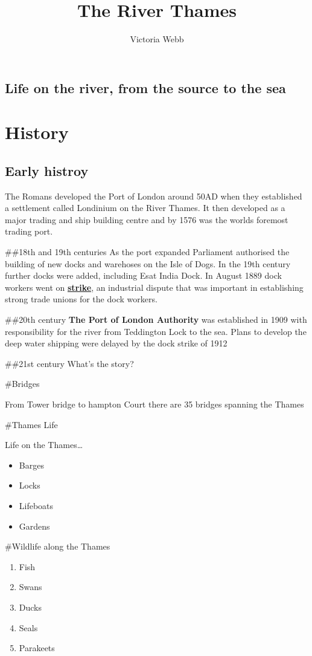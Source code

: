\documentclass[
  openany]{book}
\title{The River Thames}
\author{Victoria Webb}
\date{}
\providecommand{\tightlist}{%
  \setlength{\itemsep}{0pt}\setlength{\parskip}{0pt}}
\begin{document}
\maketitle

{
\setcounter{tocdepth}{1}
\tableofcontents
}
\hypertarget{life-on-the-river-from-the-source-to-the-sea}{%
\section{Life on the river, from the source to the sea}\label{life-on-the-river-from-the-source-to-the-sea}}

\hypertarget{history}{%
\chapter{History}\label{history}}

\hypertarget{early-histroy}{%
\section{Early histroy}\label{early-histroy}}

The Romans developed the Port of London around 50AD when they established a settlement called Londinium on the River Thames.
It then developed as a major trading and ship building centre and by 1576 was the worlds foremost trading port.

\#\#18th and 19th centuries
As the port expanded Parliament authorised the building of new docks and warehoses on the Isle of Dogs.
In the 19th century further docks were added, including Esat India Dock.
In August 1889 dock workers went on \textbf{\href{https://en.wikipedia.org/wiki/London_dock_strike,_1889}{strike}}, an industrial dispute that was important in establishing strong trade unions for the dock workers.

\#\#20th century
\textbf{The Port of London Authority} was established in 1909 with responsibility for the river from Teddington Lock to the sea.
Plans to develop the deep water shipping were delayed by the dock strike of 1912

\#\#21st century
What's the story?

\#Bridges

From Tower bridge to hampton Court there are 35 bridges spanning the Thames

\#Thames Life

Life on the Thames\ldots{}

\begin{itemize}
\tightlist
\item
  Barges
\item
  Locks
\item
  Lifeboats
\item
  Gardens
\end{itemize}

\#Wildlife along the Thames

\begin{enumerate}
\def\labelenumi{\arabic{enumi}.}
\tightlist
\item
  Fish
\item
  Swans
\item
  Ducks
\item
  Seals
\item
  Parakeets
\end{enumerate}
\end{document}
